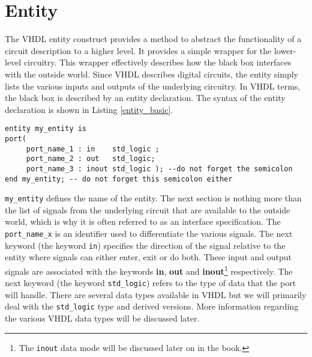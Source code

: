 \section{Entity}
The VHDL entity construct provides a method to abstract the functionality of a circuit description to a higher level. It provides a simple wrapper for the lower-level circuitry. This wrapper effectively describes how the black box interfaces with the outside world. Since VHDL describes digital circuits, the entity simply lists the various inputs and outputs of the underlying circuitry. In VHDL terms, the black box is described by an entity declaration. The syntax of the entity declaration is shown in Listing \ref{entity_basic}.
\begin{lstlisting}[label=entity_basic, caption=The entity declaration., mathescape=true]
entity my_entity is
port(
     port_name_1 : in    std_logic ;
     port_name_2 : out   std_logic;
     port_name_3 : inout std_logic ); --do not forget the semicolon
end my_entity; -- do not forget this semicolon either
\end{lstlisting}
\texttt{my\_entity} defines the name of the entity. The next section is nothing more than the list of signals from the underlying circuit that are available to the outside world, which is why it is often referred to as an interface specification. The \texttt{port\_name\_x} is an identifier used to differentiate the various signals. The next keyword (the keyword \texttt{in}) specifies the direction of the signal relative to the entity where signals can either enter, exit or do both. These input and output signals are associated with the keywords \textbf{in}, \textbf{out} and \textbf{inout}\footnote{The \texttt{inout} data mode will be discussed later on in the book.} respectively. The next keyword (the keyword \texttt{std\_logic}) refers to the type of data that the port will handle. There are several data types available in VHDL but we will primarily deal with the \texttt{std\_logic} type and derived versions. More information regarding the various VHDL data types will be discussed later.

